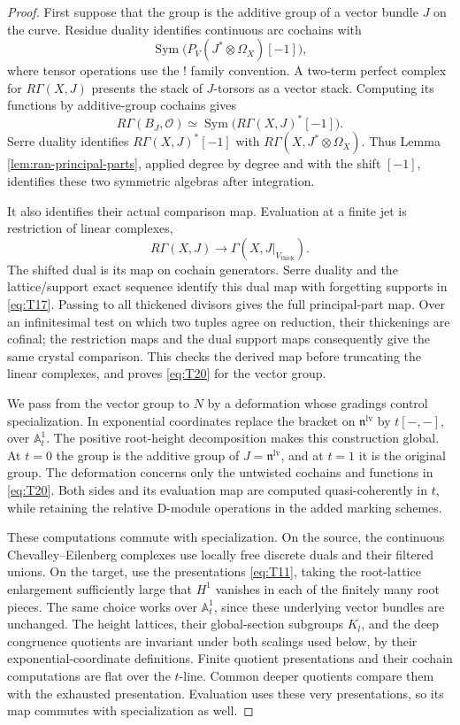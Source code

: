 \begin{proof}
First suppose that the group is the additive group of a vector bundle
$J$ on the curve.  Residue duality identifies continuous arc cochains
with
\[
 \operatorname{Sym}\bigl(P_V(J^*\otimes\Omega_X)[-1]\bigr),
\]
where tensor operations use the ! family convention.  A two-term perfect
complex for $R\Gamma(X,J)$ presents the stack of $J$-torsors as a vector
stack.  Computing its functions by additive-group cochains gives
\[
 R\Gamma(B_J,\mathcal O)
   \simeq\operatorname{Sym}\bigl(R\Gamma(X,J)^*[-1]\bigr).
\]
Serre duality identifies $R\Gamma(X,J)^*[-1]$ with
$R\Gamma(X,J^*\otimes\Omega_X)$.  Thus Lemma
\ref{lem:ran-principal-parts}, applied degree by degree and with the
shift $[-1]$, identifies these two symmetric algebras after integration.

It also identifies their actual comparison map.  Evaluation at a finite
jet is restriction of linear complexes,
\[
 R\Gamma(X,J)\longrightarrow\Gamma(X,J|_{V_{\mathrm{thick}}}).
\]
The shifted dual is its map on cochain generators.  Serre duality and
the lattice/support exact sequence identify this dual map with forgetting
supports in \eqref{eq:T17}.  Passing to all thickened divisors gives the
full principal-part map.  Over an infinitesimal test on which two tuples
agree on reduction, their thickenings are cofinal; the restriction maps
and the dual support maps consequently give the same crystal comparison.
This checks the derived map before truncating the linear complexes, and
proves \eqref{eq:T20} for the vector group.

We pass from the vector group to $N$ by a deformation whose gradings
control specialization.  In exponential coordinates replace the bracket
on $\mathfrak n^{\mathrm{lv}}$ by $t[-,-]$, over $\mathbb A^1_t$.
The positive root-height decomposition makes this construction global.
At $t=0$ the group is the additive group of
$J=\mathfrak n^{\mathrm{lv}}$, and at $t=1$ it is the original group.
The deformation concerns only the untwisted cochains and functions in
\eqref{eq:T20}.  Both sides and its evaluation map are computed
quasi-coherently in $t$, while retaining the relative D-module operations
in the added marking schemes.

These computations commute with specialization.  On the source, the
continuous Chevalley--Eilenberg complexes use locally free discrete duals
and their filtered unions.  On the target, use the presentations
\eqref{eq:T11}, taking the root-lattice enlargement sufficiently large
that $H^1$ vanishes in each of the finitely many root pieces.  The same
choice works over $\mathbb A^1_t$, since these underlying vector bundles
are unchanged.  The height lattices, their global-section subgroups
$K_l$, and the deep congruence quotients are invariant under both scalings
used below, by their exponential-coordinate definitions.  Finite quotient
presentations and their cochain computations are flat over the $t$-line.  Common deeper quotients compare
them with the exhausted presentation.  Evaluation uses these very
presentations, so its map commutes with specialization as well.


\end{proof}
